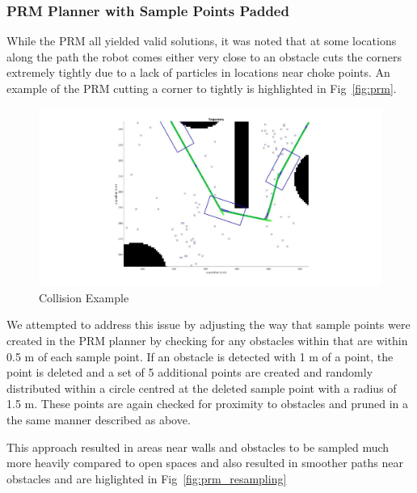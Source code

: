 \documentclass{article}
\begin{document}
\subsubsection{PRM Planner with Sample Points Padded}
\label{subsec:prm_padding}

While the PRM all yielded valid solutions, it was noted that at some locations along the path the robot comes either very close to an obstacle cuts the corners extremely tightly due to a lack of particles in locations near choke points. An example of the PRM cutting a corner to tightly is highlighted in  Fig~\ref{fig:prm}. 

\begin{figure}[H]
	\centering
	\includegraphics[width=\linewidth]{images/collision_example.jpg}
	\caption{Collision Example}
	\label{fig:collision_example}
\end{figure}


We attempted to address this issue by adjusting the way that sample points were created in the PRM planner by checking for any obstacles within that are within 0.5 m  of each sample point. If an obstacle is detected with 1 m of a point, the point is deleted and a set of 5 additional points are created and randomly distributed within a circle centred at the deleted sample point with a radius of 1.5 m. These points are again checked for proximity to obstacles and pruned in a the same manner described as above. 

This approach resulted in areas near walls and obstacles to be sampled much more heavily compared to open spaces and also resulted in smoother paths near obstacles and are higlighted in Fig~\ref{fig:prm_resampling}
\end{document}
